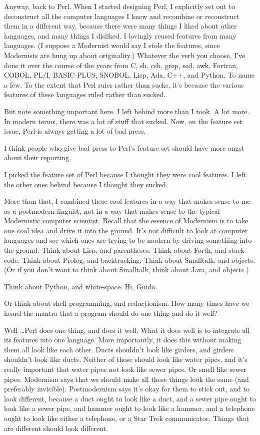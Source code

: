 \documentclass[10pt,letterpaper]{article}
\newcommand{\acro}[1]{{\small\MakeUppercase #1\spacefactor1000}}
\begin{document}
Anyway, back to Perl. When I started designing Perl, I explicitly set out to
deconstruct all the computer languages I knew and recombine or reconstruct
them in a different way, because there were many things I liked about other
languages, and many things I disliked. I lovingly reused features from many
languages. (I suppose a Modernist would say I stole the features, since
Modernists are hung up about originality.) Whatever the verb you choose, I've
done it over the course of the years from C, sh, csh, grep, sed, awk,
Fortran, \acro{COBOL}, \acro{PL/I}, \acro{BASIC-PLUS}, \acro{SNOBOL}, Lisp,
Ada, C++, and Python. To name
a few. To the extent that Perl rules rather than sucks, it's because the
various features of these languages ruled rather than sucked.

But note something important here. I left behind more than I took. A lot
more. In modern terms, there was a lot of stuff that sucked. Now, on the
feature set issue, Perl is always getting a lot of bad press.

I think people who give bad press to Perl's feature set should have more
angst about their reporting.

I picked the feature set of Perl because I thought they were cool features. I
left the other ones behind because I thought they sucked.

More than that, I combined these cool features in a way that makes sense to
me as a postmodern linguist, not in a way that makes sense to the typical
Modernistic computer scientist. Recall that the essence of Modernism is to
take one cool idea and drive it into the ground. It's not difficult to look
at computer languages and see which ones are trying to be modern by driving
something into the ground. Think about Lisp, and parentheses. Think about
Forth, and stack code. Think about Prolog, and backtracking. Think about
Smalltalk, and objects. (Or if you don't want to think about Smalltalk, think
about Java, and objects.)

Think about Python, and white-space. Hi, Guido.

Or think about shell programming, and reductionism. How many times have we
heard the mantra that a program should do one thing and do it well?

Well \ldots Perl does one thing, and does it well. What it does well is to
integrate all its features into one language. More importantly, it does this
without making them all look like each other. Ducts shouldn't look like
girders, and girders shouldn't look like ducts. Neither of those should look
like water pipes, and it's really important that water pipes not look like
sewer pipes. Or smell like sewer pipes. Modernism says that we should make
all these things look the same (and preferably invisible). Postmodernism says
it's okay for them to stick out, and to look different, because a duct ought
to look like a duct, and a sewer pipe ought to look like a sewer pipe, and
hammer ought to look like a hammer, and a telephone ought to look like either
a telephone, or a Star Trek communicator. Things that are different should
look different.
\end{document}
